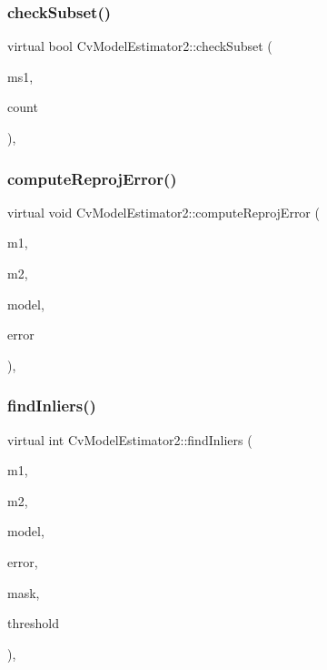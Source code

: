 \subsubsection{\texorpdfstring{check\+Subset()}{checkSubset()}}
{\footnotesize\ttfamily virtual bool Cv\+Model\+Estimator2\+::check\+Subset (\begin{DoxyParamCaption}\item[{const Cv\+Mat $\ast$}]{ms1,  }\item[{int}]{count }\end{DoxyParamCaption})\hspace{0.3cm}{\ttfamily [protected]}, {\ttfamily [virtual]}}

\mbox{\label{class_cv_model_estimator2_ae2aa4bbc11e6fc303d81b95daf2795ad}} 
\subsubsection{\texorpdfstring{compute\+Reproj\+Error()}{computeReprojError()}}
{\footnotesize\ttfamily virtual void Cv\+Model\+Estimator2\+::compute\+Reproj\+Error (\begin{DoxyParamCaption}\item[{const Cv\+Mat $\ast$}]{m1,  }\item[{const Cv\+Mat $\ast$}]{m2,  }\item[{const Cv\+Mat $\ast$}]{model,  }\item[{Cv\+Mat $\ast$}]{error }\end{DoxyParamCaption})\hspace{0.3cm}{\ttfamily [protected]}, {}}

\mbox{\label{class_cv_model_estimator2_a7683a8352f66ba994982493690f418b1}} 
\subsubsection{\texorpdfstring{find\+Inliers()}{findInliers()}}
{\footnotesize\ttfamily virtual int Cv\+Model\+Estimator2\+::find\+Inliers (\begin{DoxyParamCaption}\item[{const Cv\+Mat $\ast$}]{m1,  }\item[{const Cv\+Mat $\ast$}]{m2,  }\item[{const Cv\+Mat $\ast$}]{model,  }\item[{Cv\+Mat $\ast$}]{error,  }\item[{Cv\+Mat $\ast$}]{mask,  }\item[{double}]{threshold }\end{DoxyParamCaption})\hspace{0.3cm}{\ttfamily [protected]}, {\ttfamily [virtual]}}

